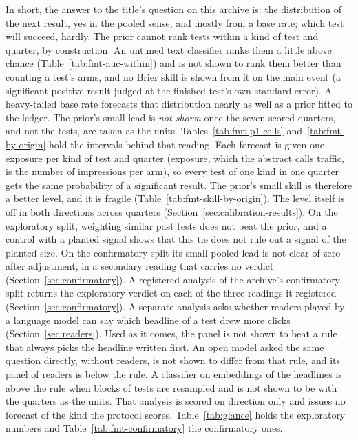 \documentclass[sigconf,nonacm]{acmart}
\begin{document}
In short, the answer to the title's question on this archive is: the distribution of the next result, yes in the pooled sense, and mostly from a base rate; which test will succeed, hardly. The prior cannot rank tests within a kind of test and quarter, by construction. An untuned text classifier ranks them a little above chance (Table~\ref{tab:fmt-auc-within}) and is not shown to rank them better than counting a test's arms, and no Brier skill is shown from it on the main event (a significant positive result judged at the finished test's own standard error). A heavy-tailed base rate forecasts that distribution nearly as well as a prior fitted to the ledger. The prior's small lead is \emph{not shown} once the seven scored quarters, and not the tests, are taken as the units. Tables~\ref{tab:fmt-p1-cells} and~\ref{tab:fmt-by-origin} hold the intervals behind that reading. Each forecast is given one exposure per kind of test and quarter (exposure, which the abstract calls traffic, is the number of impressions per arm), so every test of one kind in one quarter gets the same probability of a significant result. The prior's small skill is therefore a better level, and it is fragile (Table~\ref{tab:fmt-skill-by-origin}). The level itself is off in both directions across quarters (Section~\ref{sec:calibration-results}). On the exploratory split, weighting similar past tests does not beat the prior, and a control with a planted signal shows that this tie does not rule out a signal of the planted size. On the confirmatory split its small pooled lead is not clear of zero after adjustment, in a secondary reading that carries no verdict (Section~\ref{sec:confirmatory}). A registered analysis of the archive's confirmatory split returns the exploratory verdict on each of the three readings it registered (Section~\ref{sec:confirmatory}). A separate analysis asks whether readers played by a language model can say which headline of a test drew more clicks (Section~\ref{sec:readers}). Used as it comes, the panel is not shown to beat a rule that always picks the headline written first. An open model asked the same question directly, without readers, is not shown to differ from that rule, and its panel of readers is below the rule. A classifier on embeddings of the headlines is above the rule when blocks of tests are resampled and is not shown to be with the quarters as the units. That analysis is scored on direction only and issues no forecast of the kind the protocol scores. Table~\ref{tab:glance} holds the exploratory numbers and Table~\ref{tab:fmt-confirmatory} the confirmatory ones.
\end{document}
